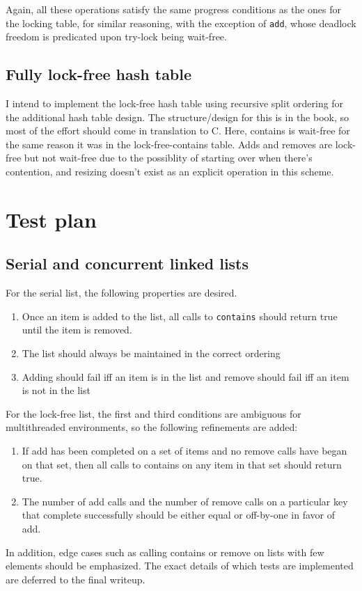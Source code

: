 \documentclass{article}
\begin{document}
Again, all these operations satisfy the same progress conditions as the ones for the locking table, for similar reasoning, with the exception of \verb|add|, whose deadlock freedom is predicated upon try-lock being wait-free. 
\subsection*{Fully lock-free hash table}
I intend to implement the lock-free hash table using recursive split ordering for the additional hash table design. The structure/design for this is in the book, so most of the effort should come in translation to C. Here, contains is wait-free for the same reason it was in the lock-free-contains table. Adds and removes are lock-free but not wait-free due to the possiblity of starting over when there's contention, and resizing doesn't exist as an explicit operation in this scheme.
\section*{Test plan}
\subsection*{Serial and concurrent linked lists}
For the serial list, the following properties are desired.
\begin{enumerate}
    \item Once an item is added to the list, all calls to \verb|contains| should return true until the item is removed.
    \item The list should always be maintained in the correct ordering
    \item Adding should fail iff an item is in the list and remove should fail iff an item is not in the list
\end{enumerate}
For the lock-free list, the first and third conditions are ambiguous for multithreaded environments, so the following refinements are added:
\begin{enumerate}
    \item If add has been completed on a set of items and no remove calls have began on that set, then all calls to contains on any item in that set should return true.
    \item The number of add calls and the number of remove calls on a particular key that complete successfully should be either equal or off-by-one in favor of add.
\end{enumerate}
In addition, edge cases such as calling contains or remove on lists with few elements should be emphasized. The exact details of which tests are implemented are deferred to the final writeup.
\end{document}

